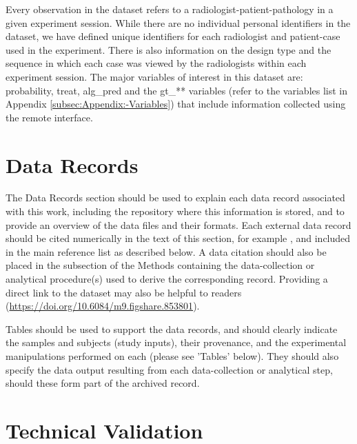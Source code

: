 \documentclass[fleqn,10pt]{wlscirep}
\begin{document}
Every observation in the dataset refers to a radiologist-patient-pathology in a given experiment session. While there are no individual personal identifiers in the dataset, we have defined unique identifiers for each radiologist and patient-case used in the experiment. There is also information on the design type and the sequence in which each case was viewed by the radiologists within each experiment session. The major variables of interest in this dataset are: probability, treat, alg\_pred and the gt\_{*}{*} variables (refer to the variables list in Appendix \ref{subsec:Appendix:-Variables}) that include information collected using the remote interface. 



\section*{Data Records}

The Data Records section should be used to explain each data record associated with this work, including the repository where this information is stored, and to provide an overview of the data files and their formats. Each external data record should be cited numerically in the text of this section, for example \cite{Hao:gidmaps:2014}, and included in the main reference list as described below. A data citation should also be placed in the subsection of the Methods containing the data-collection or analytical procedure(s) used to derive the corresponding record. Providing a direct link to the dataset may also be helpful to readers (\hyperlink{https://doi.org/10.6084/m9.figshare.853801}{https://doi.org/10.6084/m9.figshare.853801}).

Tables should be used to support the data records, and should clearly indicate the samples and subjects (study inputs), their provenance, and the experimental manipulations performed on each (please see 'Tables' below). They should also specify the data output resulting from each data-collection or analytical step, should these form part of the archived record.

\section*{Technical Validation}

\end{document}
